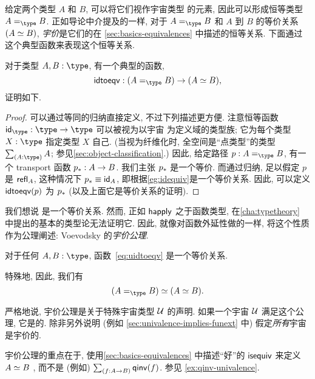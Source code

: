 %
%
给定两个类型 $A$ 和 $B$, 可以将它们视作宇宙类型 \type 的元素, 因此可以形成恒等类型 $\id[\type]AB$.
正如导论中介提及的一样, 对于 $\id[\type]AB$ 和 $A$ 到 $B$ 的等价关系 $(\eqv AB)$, \emph{宇价}是它们的在 \cref{sec:basics-equivalences} 中描述的恒等关系.
下面通过这个典型函数来表现这个恒等关系.

\begin{lem}\label{thm:idtoeqv}
  对于类型 $A,B:\type$, 有一个典型的函数,
  \begin{equation}\label{eq:uidtoeqv}
    \idtoeqv : (\id[\type]AB) \to (\eqv A B),
  \end{equation}
  证明如下.
\end{lem}
\begin{proof}
  可以通过等同的归纳直接定义, 不过下列描述更方便.
  注意恒等函数 $\idfunc[\type]:\type\to\type$ 可以被视为以宇宙 \type 为定义域的类型族; 它为每个类型 $X:\type$ 指定类型 $X$ 自己.
  (当视为纤维化时, 全空间是``点类型''的类型 $\sm{A:\type}A$; 参见\cref{sec:object-classification}.)
  因此, 给定路径 $p:A =_\type B$, 有一个 transport 函数 $\transf{p}:A \to B$.
  我们主张 $\transf{p}$ 是一个等价.
  而通过归纳, 足以假定 $p$ 是 $\refl A$, 这种情况下 $\transf{p} \jdeq \idfunc[A]$, 即根据\cref{eg:idequiv}是一个等价关系.
  因此, 可以定义 $\idtoeqv(p)$ 为 $\transf{p}$ (以及上面它是等价关系的证明).
\end{proof}

我们想说 \idtoeqv 是一个等价关系.
然而, 正如 $\happly$ 之于函数类型, 在\cref{cha:typetheory} 中提出的基本的类型论无法证明它.
因此, 就像对函数外延性做的一样, 将这个性质作为公理阐述: Voevodsky 的\emph{宇价公理}.

\begin{axiom}[Univalence]\label{axiom:univalence}
  对于任何 $A,B:\type$, 函数~\eqref{eq:uidtoeqv} 是一个等价关系.
\end{axiom}

特殊地, 因此, 我们有
  \[
\eqv{(\id[\type]{A}{B})}{(\eqv A B)}.
\]

严格地说, 宇价公理是关于特殊宇宙类型 $\UU$ 的声明.
如果一个宇宙 $\UU$ 满足这个公理, 它是的.
%
%
除非另外说明 (例如 \cref{sec:univalence-implies-funext} 中) 假定\emph{所有}宇宙是宇价的.

\begin{rmk}
  宇价公理的重点在于, 使用\cref{sec:basics-equivalences} 中描述``好''的 $\isequiv$ 来定义 $\eqv AB$ , 而不是 (例如) $\sm{f:A\to B} \qinv(f)$.
  参见 \cref{ex:qinv-univalence}.
\end{rmk}


